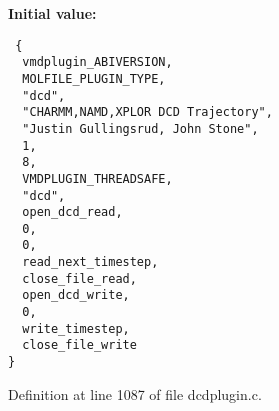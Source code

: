 {\bf Initial value:}

\footnotesize\begin{verbatim} {
  vmdplugin_ABIVERSION,                         
  MOLFILE_PLUGIN_TYPE,                          
  "dcd",                                        
  "CHARMM,NAMD,XPLOR DCD Trajectory",           
  "Justin Gullingsrud, John Stone",             
  1,                                            
  8,                                            
  VMDPLUGIN_THREADSAFE,                         
  "dcd",                                        
  open_dcd_read,
  0,
  0,
  read_next_timestep,
  close_file_read,
  open_dcd_write,
  0,
  write_timestep,
  close_file_write
}\end{verbatim}\normalsize 


Definition at line 1087 of file dcdplugin.c.